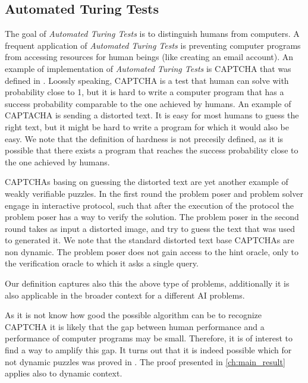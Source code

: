 \documentclass[11pt,a4paper,titlepage]{memoir}
\begin{document}
\subsection{Automated Turing Tests}
The goal of \textit{Automated Turing Tests} is to distinguish humans from computers.
A frequent application of \textit{Automated Turing Tests} is preventing computer programs from accessing resources
for human beings (like creating an email account).
An example of implementation of \textit{Automated Turing Tests} is CAPTCHA that was defined in \cite{von2003captcha}.
Loossly speaking, CAPTCHA is a test that human can solve with probability close to 1, but it is hard to write a computer program
that has a success probability comparable to the one achieved by humans.
An example of CAPTACHA is sending a distorted text. It is easy for most humans to guess the right text, but it might be hard to write
a program for which it would also be easy. We note that the definition of hardness is not precesily defined, as it is possible that
there exists a program that reaches the success probability close to the one achieved by humans.

CAPTCHAs basing on guessing the distorted text are yet another example of weakly verifiable puzzles.
In the first round the problem poser and problem solver engage in interactive protocol, such that
after the execution of the protocol the problem poser has a way to verify the solution.
The problem poser in the second round takes as input a distorted image, and try to guess the text that was used to generated it.
We note that the standard distorted text base CAPTCHAs are non dynamic. The problem poser does not gain access to the hint oracle,
only to the verification oracle to which it asks a single query.

Our definition captures also this the above type of problems, additionally it is also applicable in the broader context for a different
AI problems.

As it is not know how good the possible algorithm can be to recognize CAPTCHA it is likely that the gap between human
performance and a performance of computer programs may be small. Therefore, it is of interest to find
a way to amplify this gap.
It turns out that it is indeed possible which for not dynamic puzzles was proved in \cite{DBLP:journals/corr/abs-1002-3534}.
The proof presented in \ref{ch:main_result} applies also to dynamic context.

\end{document}
